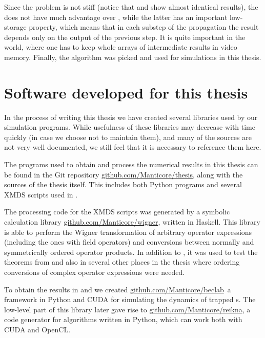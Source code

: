 Since the problem is not stiff (notice that  and  show almost identical results), the  does not have much advantage over , while the latter has an important low-storage property, which means that in each substep of the  propagation the result depends only on the output of the previous step.
It is quite important in the  world, where one has to keep whole arrays of intermediate results in video memory.
Finally, the  algorithm was picked and used for simulations in this thesis.


\section{Software developed for this thesis}

In the process of writing this thesis we have created several libraries used by our simulation programs.
While usefulness of these libraries may decrease with time quickly (in case we choose not to maintain them), and many of the sources are not very well documented, we still feel that it is necessary to reference them here.

The programs used to obtain and process the numerical results in this thesis can be found in the Git repository \href{http://github.com/Manticore/thesis}{github.com/Manticore/thesis}, along with the sources of the thesis itself.
This includes both Python programs and several XMDS scripts used in .

The processing code for the XMDS scripts was generated by a symbolic calculation library \href{http://github.com/Manticore/wigner}{github.com/Manticore/wigner}, written in Haskell.
This library is able to perform the Wigner transformation of arbitrary operator expressions (including the ones with field operators) and conversions between normally and symmetrically ordered operator products.
In addition to , it was used to test the theorems from  and also in several other places in the thesis where ordering conversions of complex operator expressions were needed.

To obtain the results in  and  we created \href{http://github.com/Manticore/beclab}{github.com/Manticore/beclab} a framework in Python and CUDA for simulating the dynamics of trapped s.
The low-level part of this library later gave rise to \href{http://github.com/Manticore/reikna}{github.com/Manticore/reikna}, a code generator for  algorithms written in Python, which can work both with CUDA and OpenCL.
